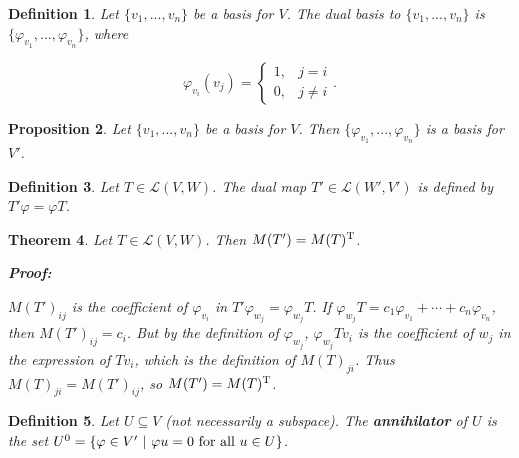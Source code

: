 \documentclass{article}
\theoremstyle{colontheorem}
\newtheorem{theorem}{Theorem}[section]
\newtheorem{proposition}[theorem]{Proposition}
\newtheorem{definition}[theorem]{Definition}
\newenvironment{Theorem}
{
	\begin{mdframed}[backgroundcolor=TheoremOrange!10]
	\begin{theorem}
}
{
	\end{theorem}
	\end{mdframed}
	
	\vspace{.15in}
}
\newenvironment{Proposition}
{
	\begin{mdframed}[backgroundcolor=TheoremOrange!10]
	\begin{proposition}
}
{
	\end{proposition}
	\end{mdframed}
	
	\vspace{.15in}
}
\newenvironment{Def}
{
	\begin{mdframed}[backgroundcolor=DefGreen!10]
	\begin{definition}
}
{
	\end{definition}
	\end{mdframed}
	
	\vspace{.15in}
}
\newenvironment{Proof}
{
	\begin{mdframed}[backgroundcolor=ProofPurple!10]
	\textbf{Proof:}%
}
{
	\end{mdframed}
	
	\vspace{.085in}
}
\begin{document}
\begin{Def}
	
	Let $\{v_1, ..., v_n\}$ be a basis for $V$. The dual basis to $\{v_1, ..., v_n\}$ is $\{\varphi_{v_1}, ..., \varphi_{v_n}\}$, where
	
	$$
	\varphi_{v_i}(v_j) = \begin{cases} 
	1, & j = i \\
	0, & j \neq i
	\end{cases}.
	$$
	
\end{Def}



\begin{Proposition}
	
	Let $\{v_1, ..., v_n\}$ be a basis for $V$. Then $\{\varphi_{v_1}, ..., \varphi_{v_n}\}$ is a basis for $V'$.
	
\end{Proposition}



\begin{Def}
	
	Let $T \in \mathcal{L}(V,W)$. The dual map $T' \in \mathcal{L}(W',V')$ is defined by $T'\varphi = \varphi T$.
	
\end{Def}



\begin{Theorem}
	
	Let $T \in \mathcal{L}(V,W)$. Then $M(T') = M(T)^\textnormal{T}$.
	
	\begin{Proof}
		$M(T')_{ij}$ is the coefficient of $\varphi_{v_i}$ in $T'\varphi_{w_j} = \varphi_{w_j} T$. If $\varphi_{w_j} T = c_1 \varphi_{v_1} + \cdots + c_n \varphi_{v_n}$, then $M(T')_{ij} = c_i$. But by the definition of $\varphi_{w_j}$, $\varphi_{w_j} Tv_i$ is the coefficient of $w_j$ in the expression of $Tv_i$, which is the definition of $M(T)_{ji}$. Thus $M(T)_{ji} = M(T')_{ij}$, so $M(T') = M(T)^\textnormal{T}$.
		
	\end{Proof}
	
\end{Theorem}



\begin{Def}
	
	Let $U \subseteq V$ (not necessarily a subspace). The \textbf{annihilator} of $U$ is the set $U^0 = \{\varphi \in V'\ |\ \varphi u = 0\ \textnormal{for all}\ u \in U\}$.
	
\end{Def}
\end{document}
